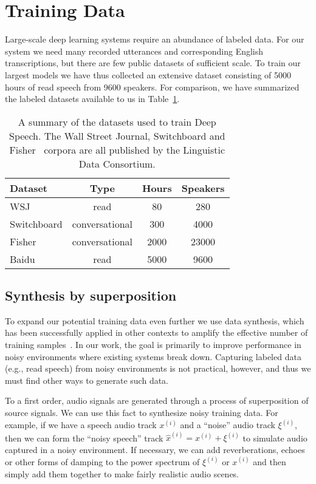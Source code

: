 \section{Training Data}
\label{sec:deepspeech:data}

Large-scale deep learning systems require an abundance of labeled data. For our
system we need many recorded utterances and corresponding English
transcriptions, but there are few public datasets of sufficient scale. To train
our largest models we have thus collected an extensive dataset consisting of
5000 hours of read speech from 9600 speakers. For comparison, we have
summarized the labeled datasets available to us in
Table~\ref{table:deepspeech:datasets}.

\begin{table}[]
\centering
\begin{tabular}{l c c c}
 \toprule
 Dataset & Type & Hours & Speakers  \\
 \midrule
 WSJ         & read           &   80 & 280 \\
 Switchboard & conversational &  300 & 4000 \\
 Fisher      & conversational & 2000 & 23000 \\
 Baidu       & read           & 5000 & 9600 \\
 \bottomrule
\end{tabular}
\caption{A summary of the datasets used to train Deep Speech. The Wall Street
         Journal, Switchboard and Fisher~\cite{cieri2004fisher} corpora are all
         published by the Linguistic Data Consortium.}
\label{table:deepspeech:datasets}
\end{table}

\subsection{Synthesis by superposition}
\label{sec:deepspeech:noisesynth}

To expand our potential training data even further we use data synthesis, which
has been successfully applied in other contexts to amplify the effective number
of training samples~\cite{sapp2008, lecun2004, coates2011}. In our work, the
goal is primarily to improve performance in noisy environments where existing
systems break down. Capturing labeled data (e.g., read speech) from noisy
environments is not practical, however, and thus we must find other ways to
generate such data.

To a first order, audio signals are generated through a process of
superposition of source signals. We can use this fact to synthesize noisy
training data. For example, if we have a speech audio track $x^{(i)}$ and a
``noise'' audio track $\xi^{(i)}$, then we can form the ``noisy speech'' track
$\hat{x}^{(i)} = x^{(i)}+\xi^{(i)}$ to simulate audio captured in a noisy
environment. If necessary, we can add reverberations, echoes or other forms of
damping to the power spectrum of $\xi^{(i)}$ or $x^{(i)}$ and then simply add
them together to make fairly realistic audio scenes.

